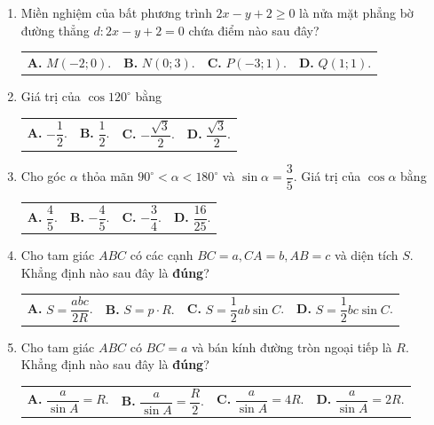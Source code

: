 \documentclass[12pt,a4paper]{article}
\makeatletter
\newcommand{\four}[4]{\par\noindent\begin{tabularx}{\linewidth}{@{}*{4}{>{\raggedright\arraybackslash}X}@{}}\textbf{A.} #1&\textbf{B.} #2&\textbf{C.} #3&\textbf{D.} #4\end{tabularx}}
\makeatother
\begin{document}
\begin{enumerate}
\item Miền nghiệm của bất phương trình $2x - y + 2 \ge 0$ là nửa mặt phẳng bờ đường thẳng $d: 2x - y + 2 = 0$ chứa điểm nào sau đây?
\four{$M(-2; 0)$.}{$N(0; 3)$.}{$P(-3; 1)$.}{$Q(1; 1)$.}

\item Giá trị của $\cos 120^\circ$ bằng
\four{$-\dfrac{1}{2}$.}{$\dfrac{1}{2}$.}{$-\dfrac{\sqrt{3}}{2}$.}{$\dfrac{\sqrt{3}}{2}$.}

\item Cho góc $\alpha$ thỏa mãn $90^\circ < \alpha < 180^\circ$ và $\sin \alpha = \dfrac{3}{5}$. Giá trị của $\cos \alpha$ bằng
\four{$\dfrac{4}{5}$.}{$-\dfrac{4}{5}$.}{$-\dfrac{3}{4}$.}{$\dfrac{16}{25}$.}

\item Cho tam giác $ABC$ có các cạnh $BC = a, CA = b, AB = c$ và diện tích $S$. Khẳng định nào sau đây là \textbf{đúng}?
\four{$S = \dfrac{abc}{2R}$.}{$S = p \cdot R$.}{$S = \dfrac{1}{2}ab \sin C$.}{$S = \dfrac{1}{2}bc \sin C$.}

\item Cho tam giác $ABC$ có $BC = a$ và bán kính đường tròn ngoại tiếp là $R$. Khẳng định nào sau đây là \textbf{đúng}?
\four{$\dfrac{a}{\sin A} = R$.}{$\dfrac{a}{\sin A} = \dfrac{R}{2}$.}{$\dfrac{a}{\sin A} = 4R$.}{$\dfrac{a}{\sin A} = 2R$.}
\end{enumerate}
\end{document}
